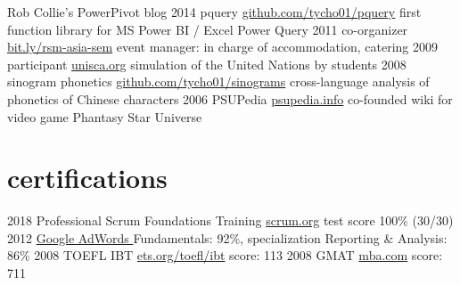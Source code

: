\documentclass[]{friggeri-cv}
\begin{document}
\begin{entrylist}
{      Rob Collie's PowerPivot blog
    }
  \entry
    {2014}
    {pquery}
    {\href{https://github.com/KiaraGrouwstra/pquery}{github.com/tycho01/pquery}}
    {
      first function library for
      MS Power BI / Excel Power Query
    }
  \entry
    {2011}
    {
      co-organizer
    }
    {\href{https://www.facebook.com/Doing-Business-in-Asia-Seminar-310520148998549/}{bit.ly/rsm-asia-sem}}
    {
      event manager:
      in charge of accommodation, catering
    }
  \entry
    {2009}
    {
      participant
    }
    {\href{http://unisca.org/}{unisca.org}}
    {
      simulation of the United Nations by students
    }
  \entry
    {2008}
    {
      sinogram phonetics
    }
    {\href{https://github.com/KiaraGrouwstra/sinograms}{github.com/tycho01/sinograms}}
    {
      cross-language analysis of phonetics of Chinese characters
    }
  \entry
    {2006}
    {PSUPedia}
    {\href{http://psupedia.info/}{psupedia.info}}
    {
      co-founded wiki for video game
      Phantasy Star Universe
    }
\end{entrylist}

\section{certifications}

\begin{entrylist}
  \entry
    {2018}
    {Professional Scrum Foundations Training}
    {\href{https://www.scrum.org/courses/professional-scrum-foundations-training}{scrum.org}}
    {test score 100\% (30/30)}
  \entry
    {2012}
    {\href{https://support.google.com/partners/answer/3154326}{Google AdWords }}
    {}
    {Fundamentals: 92\%,
    specialization
    Reporting \& Analysis: 86\%}
  \entry
    {2008}
    {TOEFL IBT}
    {\href{https://www.ets.org/toefl/ibt}{ets.org/toefl/ibt}}
    {score: 113}
  \entry
    {2008}
    {GMAT}
    {\href{https://www.mba.com/}{mba.com}}
    {score: 711}
\end{entrylist}
\end{document}
